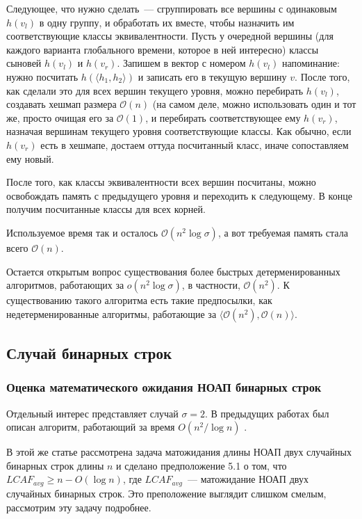 Следующее, что нужно сделать~--- сгруппировать все вершины с одинаковым $h(v_l)$ в одну группу, и обработать их вместе, чтобы назначить им соответствующие классы эквивалентности. Пусть у очередной вершины (для каждого варианта глобального времени, которое в ней интересно) классы сыновей $h(v_l)$ и $h(v_r)$. Запишем в вектор с номером $h(v_l)$ напоминание: нужно посчитать $h(\langle h_1, h_2 \rangle)$ и записать его в текущую вершину $v$. После того, как сделали это для всех вершин текущего уровня, можно перебирать $h(v_l)$, создавать хешмап размера $\mathcal{O}(n)$ (на самом деле, можно использовать один и тот же, просто очищая его за $\mathcal{O}(1)$, и перебирать соответствующее ему $h(v_r)$, назначая вершинам текущего уровня соответствующие классы. Как обычно, если $h(v_r)$ есть в хешмапе, достаем оттуда посчитанный класс, иначе сопоставляем ему новый. 

После того, как классы эквивалентности всех вершин посчитаны, можно освобождать память с предыдущего уровня и переходить к следующему. В конце получим посчитанные классы для всех корней.

Используемое время так и осталось $\mathcal{O}(n^2 \log \sigma)$, а вот требуемая память стала всего $\mathcal{O}(n)$.

Остается открытым вопрос существования более быстрых детерменированных алгоритмов, работающих за $o(n^2 \log \sigma)$, в частности, $\mathcal{O}(n^2)$. К существованию такого алгоритма есть такие предпосылки, как недетерменированные алгоритмы, работающие за $\langle \mathcal{O}(n^2), \mathcal{O}(n) \rangle$.

\subsection{Случай бинарных строк}

\subsubsection{Оценка математического ожидания НОАП бинарных строк}
Отдельный интерес представляет случай $\sigma=2$. В предыдущих работах был описан алгоритм, работающий за время $O(n^2/\log n)$ \cite{1}.

В этой же статье рассмотрена задача матожидания длины НОАП двух случайных бинарных строк длины $n$ и сделано предположение 5.1 о том, что $LCAF_{avg} \ge n - O(\log n)$, где $LCAF_{avg}$~--- матожидание НОАП двух случайных бинарных строк. Это преположение выглядит слишком смелым, рассмотрим эту задачу подробнее.


